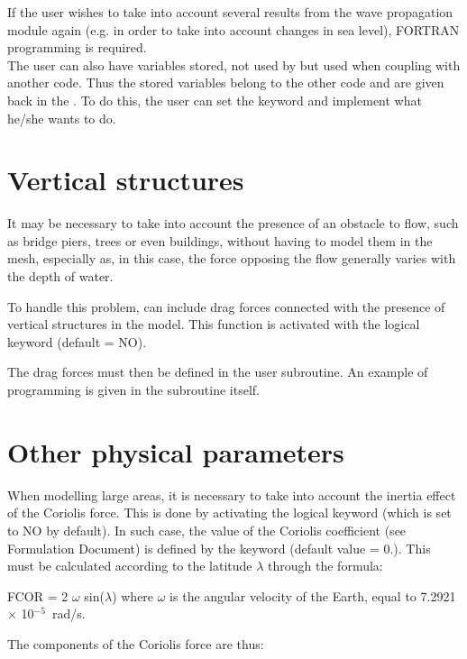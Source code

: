 If the user wishes to take into account several results from the wave
propagation module again (e.g. in order to take into account changes in sea
level), FORTRAN programming is required.\\

The user can also have variables stored, not used by  but used
when coupling  with another code.
Thus the stored variables belong to the other code and are given back
in the .
To do this, the user can set the 
keyword and implement what he/she wants to do.


\section{Vertical structures}

It may be necessary to take into account the presence of an obstacle to flow,
such as bridge piers, trees or even buildings, without having to model them in
the mesh, especially as, in this case, the force opposing the flow generally
varies with the depth of water.

To handle this problem,  can include drag forces connected with the
presence of vertical structures in the model.
This function is activated with the logical keyword 
(default = NO).

The drag forces must then be defined in the  user subroutine.
An example of programming is given in the subroutine itself.


\section{Other physical parameters}

When modelling large areas, it is necessary to take into account the inertia
effect of the Coriolis force.
This is done by activating the logical keyword  (which is set
to NO by default).
In such case, the value of the Coriolis coefficient (see Formulation Document)
is defined by the keyword  (default value = 0.).
This must be calculated according to the latitude $\lambda$ through the formula:

 FCOR = 2 $\omega$ sin($\lambda$) where $\omega$ is the angular velocity of the
Earth, equal to 7.2921 $\times$ 10$^{-5}$~rad/s.

The components of the Coriolis force are thus:

